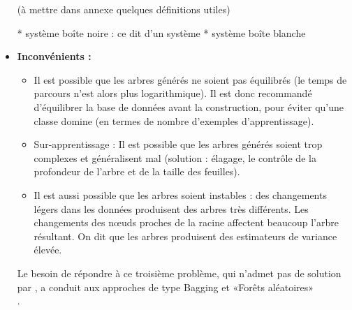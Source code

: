 \documentclass[11pt]{article}
\begin{document}
\begin{itemize}
\begin{itemize}
    \end{itemize}

(à mettre dans annexe quelques définitions utiles)

* système boîte noire : ce dit d'un système
* système boîte blanche

\renewcommand{\labelitemi}{$\bullet$}
\item \textbf{Inconvénients :}

    \begin{itemize}

    \item Il est possible que les arbres générés ne soient pas équilibrés (le temps de parcours n’est alors plus logarithmique).
    Il est donc recommandé d’équilibrer la base de données avant la construction, pour éviter qu’une classe domine (en termes de nombre d’exemples d’apprentissage). 

    \item Sur-apprentissage : Il est possible que les arbres générés soient trop complexes et généralisent mal (solution : élagage, le contrôle de la profondeur de l’arbre et de la taille des feuilles).


    \item Il est aussi possible que les arbres soient instables : des changements légers dans les données produisent des arbres très différents. Les changements des nœuds proches de la racine affectent beaucoup l’arbre résultant. On dit que les arbres produisent des estimateurs de variance élevée.

    \end{itemize}

Le besoin de répondre à ce troisième problème, qui n’admet pas de solution par , a conduit aux approches de type Bagging et «Forêts aléatoires» \\
 .\par

\end{itemize}
\end{document}
